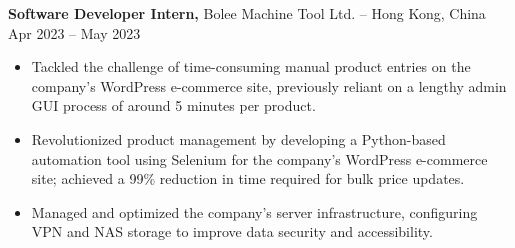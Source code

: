 \textbf{Software Developer Intern,} {Bolee Machine Tool Ltd.} -- Hong Kong, China \hfill Apr 2023 -- May 2023 \\
\vspace{-9pt}
\begin{itemize}
  \item Tackled the challenge of time-consuming manual product entries on the company’s WordPress e-commerce site, previously reliant on a lengthy admin GUI process of around 5 minutes per product.
  \item Revolutionized product management by developing a Python-based automation tool using Selenium for the company’s WordPress e-commerce site; achieved a 99\% reduction in time required for bulk price updates.
  \item Managed and optimized the company’s server infrastructure, configuring VPN and NAS storage to improve data security and accessibility.
\end{itemize}